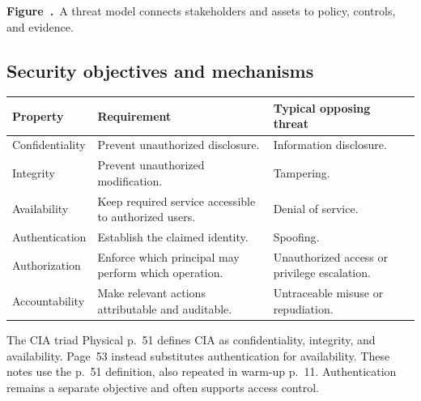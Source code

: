 \documentclass[11pt,a4paper]{article}
\numberwithin{figure}{section}
\newcommand{\diagramcaption}[1]{\par\smallskip\refstepcounter{figure}\begin{center}\small\textbf{Figure~\thefigure.}~#1\end{center}}
\begin{document}
\begin{center}
\end{center}
\diagramcaption{A threat model connects stakeholders and assets to policy, controls, and evidence.}

\subsection{Security objectives and mechanisms}
\par\noindent\begin{tabularx}{\linewidth}{@{}lYY@{}}\toprule
Property & Requirement & Typical opposing threat\\\midrule
Confidentiality & Prevent unauthorized disclosure. & Information disclosure.\\
Integrity & Prevent unauthorized modification. & Tampering.\\
Availability & Keep required service accessible to authorized users. & Denial of service.\\
Authentication & Establish the claimed identity. & Spoofing.\\
Authorization & Enforce which principal may perform which operation. & Unauthorized access or privilege escalation.\\
Accountability & Make relevant actions attributable and auditable. & Untraceable misuse or repudiation.\\\bottomrule
\end{tabularx}\par

\begin{correction}{The CIA triad}
Physical p.~51 defines CIA as confidentiality, integrity, and availability. Page~53 instead substitutes authentication for availability. These notes use the p.~51 definition, also repeated in warm-up p.~11. Authentication remains a separate objective and often supports access control.
\end{correction}
\end{document}
